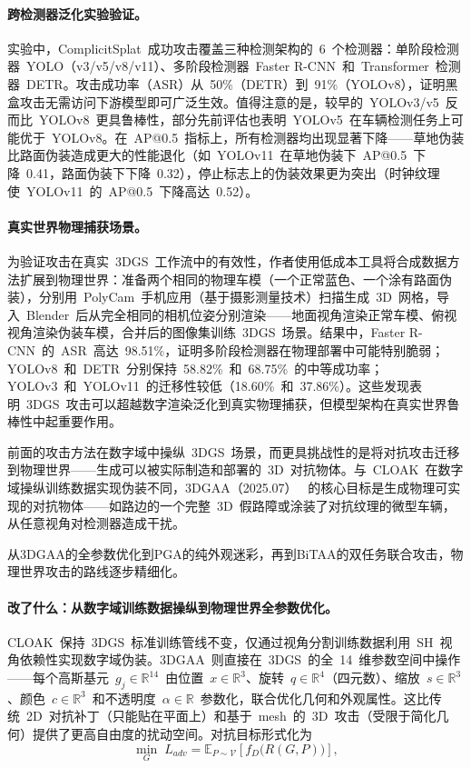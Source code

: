 \paragraph{跨检测器泛化实验验证。}
实验中，ComplicitSplat~成功攻击覆盖三种检测架构的~6~个检测器：单阶段检测器~YOLO（v3/v5/v8/v11）、多阶段检测器~Faster R-CNN~和~Transformer~检测器~DETR。攻击成功率（ASR）从~50\%（DETR）到~91\%（YOLOv8），证明黑盒攻击无需访问下游模型即可广泛生效。值得注意的是，较早的~YOLOv3/v5~反而比~YOLOv8~更具鲁棒性，部分先前评估也表明~YOLOv5~在车辆检测任务上可能优于~YOLOv8。在~AP@0.5~指标上，所有检测器均出现显著下降——草地伪装比路面伪装造成更大的性能退化（如~YOLOv11~在草地伪装下~AP@0.5~下降~0.41，路面伪装下下降~0.32），停止标志上的伪装效果更为突出（时钟纹理使~YOLOv11~的~AP@0.5~下降高达~0.52）。

\paragraph{真实世界物理捕获场景。}
为验证攻击在真实~3DGS~工作流中的有效性，作者使用低成本工具将合成数据方法扩展到物理世界：准备两个相同的物理车模（一个正常蓝色、一个涂有路面伪装），分别用~PolyCam~手机应用（基于摄影测量技术）扫描生成~3D~网格，导入~Blender~后从完全相同的相机位姿分别渲染——地面视角渲染正常车模、俯视视角渲染伪装车模，合并后的图像集训练~3DGS~场景。结果中，Faster R-CNN~的~ASR~高达~98.51\%，证明多阶段检测器在物理部署中可能特别脆弱；YOLOv8~和~DETR~分别保持~58.82\%~和~68.75\%~的中等成功率；YOLOv3~和~YOLOv11~的迁移性较低（18.60\%~和~37.86\%）。这些发现表明~3DGS~攻击可以超越数字渲染泛化到真实物理捕获，但模型架构在真实世界鲁棒性中起重要作用。

前面的攻击方法在数字域中操纵~3DGS~场景，而更具挑战性的是将对抗攻击迁移到物理世界——生成可以被实际制造和部署的~3D~对抗物体。与~CLOAK~在数字域操纵训练数据实现伪装不同，3DGAA（2025.07）~\cite{2507_09993} 的核心目标是生成物理可实现的对抗物体——如路边的一个完整~3D~假路障或涂装了对抗纹理的微型车辆，从任意视角对检测器造成干扰。

从3DGAA的全参数优化到PGA的纯外观迷彩，再到BiTAA的双任务联合攻击，物理世界攻击的路线逐步精细化。

\paragraph{改了什么：从数字域训练数据操纵到物理世界全参数优化。}
CLOAK~保持~3DGS~标准训练管线不变，仅通过视角分割训练数据利用~SH~视角依赖性实现数字域伪装。3DGAA~则直接在~3DGS~的全~14~维参数空间中操作——每个高斯基元~$g_j \in \mathbb{R}^{14}$~由位置~$x \in \mathbb{R}^3$、旋转~$q \in \mathbb{R}^4$（四元数）、缩放~$s \in \mathbb{R}^3$、颜色~$c \in \mathbb{R}^3$~和不透明度~$\alpha \in \mathbb{R}$~参数化，联合优化几何和外观属性。这比传统~2D~对抗补丁（只能贴在平面上）和基于~mesh~的~3D~攻击（受限于简化几何）提供了更高自由度的扰动空间。对抗目标形式化为
\begin{equation}
    \min_{G} \; L_{adv} = \mathbb{E}_{P \sim \mathcal{V}} \left[ f_D\bigl(R(G, P)\bigr) \right],
\end{equation}

